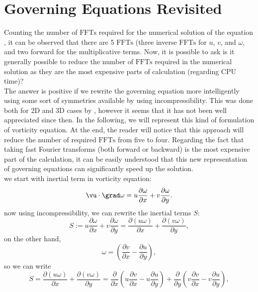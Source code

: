 \documentclass[12pt]{article}
\begin{document}
\section{Governing Equations Revisited}
Counting the number of $\text{FFTs}$ required for the numerical solution of
the equation , it can be observed that there are 5 $\text{FFTs}$
(three inverse $\text{FFTs}$ for $u$, $v$, and $\omega$, and two forward
for the multiplicative terms. Now, it is possible to ask is it generally
possible to reduce the number of $\text{FFTs}$ required in the numerical
solution as they are the most expensive parts of calculation (regarding CPU time)?		\\
The answer is positive if we rewrite the governing equation more intelligently using some sort of symmetries available by using incompressibility. This was done both for 2D and 3D cases by
, however it seems that it has not been well appreciated since then. In the following, we will represent this kind of formulation of vorticity equation. At the end, the reader will notice that this approach will reduce the number of required $\text{FFTs}$ from five to four. Regarding the
fact that taking fast Fourier transforms (both forward or backward) is the most expensive part of the calculation, it can be easily understood that this new representation of governing equations can significantly speed up the solution. 	\\
we start with inertial term in vorticity equation:
\begin{equation}\label{Eq-15}
\vu\cdot\grad\omega=u\dfrac{\partial \omega}{\partial x}+v\dfrac{\partial \omega}{\partial y}.
\end{equation}
now using incompressibility, we can rewrite the inertial terms $S$:
\begin{equation}\label{Eq-16}
S :=u\dfrac{\partial \omega}{\partial x}+v\dfrac{\partial \omega}{\partial y}=\dfrac{\partial (u\omega)}{\partial x}+\dfrac{\partial (v\omega)}{\partial y},
\end{equation}
on the other hand,
\begin{equation}\label{Eq-17}
\omega=\left(\dfrac{\partial v}{\partial x}-\dfrac{\partial u}{\partial y}\right),
\end{equation}
so we can write
\begin{equation}\label{Eq-18}
S =\dfrac{\partial (u\omega)}{\partial x}+\dfrac{\partial (v\omega)}{\partial y}=\dfrac{\partial}{\partial x} \left(u\dfrac{\partial v}{\partial x}-u\dfrac{\partial u}{\partial y}\right)+\dfrac{\partial}{\partial y} \left(v\dfrac{\partial v}{\partial x}-v\dfrac{\partial u}{\partial y}\right),
\end{equation}
\end{document}
